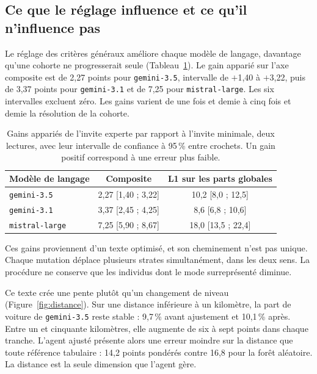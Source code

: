 \subsection{Ce que le réglage influence et ce qu'il n'influence pas}
\label{sec:tuning}

Le réglage des critères généraux améliore chaque modèle de langage, davantage qu'une cohorte ne progresserait seule (Tableau~\ref{tab:gains}). Le gain apparié sur l'axe composite est de 2,27 points pour \texttt{gemini-3.5}, intervalle de $+$1,40 à $+$3,22, puis de 3,37 points pour \texttt{gemini-3.1} et de 7,25 pour \texttt{mistral-large}. Les six intervalles excluent zéro. Les gains varient de une fois et demie à cinq fois et demie la résolution de la cohorte.

\begin{table}[tp]
  \caption{Gains appariés de l'invite experte par rapport à l'invite minimale, deux lectures, avec leur intervalle de confiance à 95\,\% entre crochets. Un gain positif correspond à une erreur plus faible.}
  \label{tab:gains}
  \begin{tabular}{lcc}
    \toprule
    Modèle de langage & Composite & L1 sur les parts globales \\
    \midrule
    \texttt{gemini-3.5}    & 2,27 [1,40 ; 3,22] & 10,2 [8,0 ; 12,5]  \\
    \texttt{gemini-3.1}    & 3,37 [2,45 ; 4,25] &  8,6 [6,8 ; 10,6]  \\
    \texttt{mistral-large} & 7,25 [5,90 ; 8,67] & 18,0 [13,5 ; 22,4] \\
    \bottomrule
  \end{tabular}
\end{table}

Ces gains proviennent d'un texte optimisé, et son cheminement n'est pas unique. Chaque mutation déplace plusieurs strates simultanément, dans les deux sens. La procédure ne conserve que les individus dont le mode surreprésenté diminue.

Ce texte crée une pente plutôt qu'un changement de niveau (Figure~\ref{fig:distance}). Sur une distance inférieure à un kilomètre, la part de voiture de \texttt{gemini-3.5} reste stable : 9,7\,\% avant ajustement et 10,1\,\% après. Entre un et cinquante kilomètres, elle augmente de six à sept points dans chaque tranche. L'agent ajusté présente alors une erreur moindre sur la distance que toute référence tabulaire : 14,2 points pondérés contre 16,8 pour la forêt aléatoire. La distance est la seule dimension que l'agent gère.

